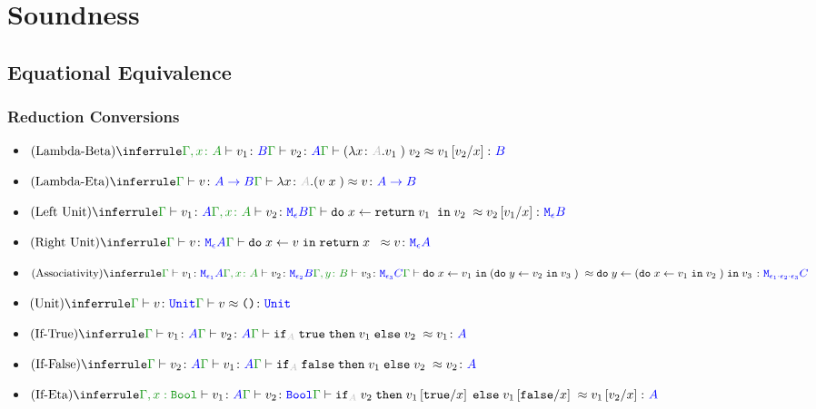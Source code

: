 \documentclass{report}
\begin{document}
\chapter{Soundness}
\section{Equational Equivalence}
\subsection{Reduction Conversions}
\begin{itemize}
    \item $\ntreeruleII{Lambda-Beta}{\typerelation{\gax}{v_1}{B}}{\gtyperelation{v_2}{A}}{\gberelation{\apply{(\lam{x}{A}{v_1})}{v_2} }{ v_1\ssub{x}{v_2}}{B}}$
    
    \item $\ntreeruleI{Lambda-Eta}{\gtyperelation{v}{\ab}}{\gberelation{\lam{x}{A}{(\apply{v}{x}})}{v}{\ab}}$
 

    \item $\ntreeruleII{Left Unit}{\gtyperelation{v_1}{A}}{\typerelation{\gax}{v_2}{\meb}}{\gberelation{\doin{x}{\return{v_1}}{v_2}}{v_2\ssub{x}{v_1}}{\meb}}$
    
    \item $\ntreeruleI{Right Unit}{\gtyperelation{v}{\mea}}{\gberelation{\doin{x}{v}{\return{x}} }{v}{\mea}}$
    \item $\ntreeruleIII{Associativity}{
            \gtyperelation{v_1}{\M{\e_1}{A}} 
        }{
            \typerelation{\gax}{v_2}{\M{\e_2}{B}}
        }{
            \typerelation{\gby}{v_3}{\M{\e_3}{C}}
        }{
        \gberelation{\doin{x}{v_1}{(\doin{y}{v_2}{v_3})}}{\doin{y}{(\doin{x}{v_1}{v_2})}{v_3}}{\M{\e_1 \dot \e_2 \dot \e_3}{C}}
    }$

    \item $\ntreeruleI{Unit}{\gtyperelation{v}{\U}}{\gberelation{v}{\u}{\U}}$

    \item $\ntreeruleII{If-True}{\gtyperelation{v_1}{ A}}{\gtyperelation{v_2}{ A}}{\gberelation{\pifthenelse{A}{\t}{v_1}{v_2}}{v_1}{ A}}$
    
    \item $\ntreeruleII{If-False}{\gtyperelation{v_2}{ A}}{\gtyperelation{v_1}{ A}}{\gberelation{\pifthenelse{A}{\f}{v_1}{v_2}}{v_2}{ A}}$
    
    \item $\ntreeruleII{If-Eta}{\typerelation{\G, x: \B}{v_1}{ A}}{\gtyperelation{v_2}{\B}}{\gberelation{\pifthenelse{A}{v_2}{v_1\ssub{x}{\t}}{v_1\ssub{x}{\f}}}{v_1\ssub{x}{v_2}}{ A}}$
    
\end{itemize}
\end{document}
